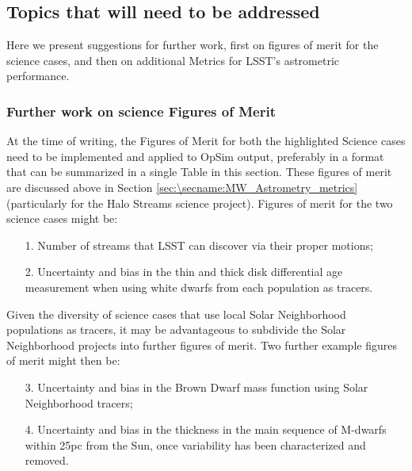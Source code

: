 \subsection{Topics that will need to be addressed}
\label{sec:\secname:MW_Astrometry_furtherwork}

Here we present suggestions for further work, first on figures of
merit for the science cases, and then on additional Metrics for LSST's
astrometric performance.

\subsubsection{Further work on science Figures of Merit}

At the time of writing, the Figures of Merit for both the highlighted
Science cases need to be implemented and applied to OpSim output,
preferably in a format that can be summarized in a single Table in
this section. These figures of merit are discussed above in Section
\ref{sec:\secname:MW_Astrometry_metrics} (particularly for the Halo
Streams science project). Figures of merit for the two science cases
might be:
\begin{itemize}
  \item[1.] Number of streams that LSST can discover via their proper motions;
\item[2.] Uncertainty and bias in the thin and thick disk differential age measurement when using white dwarfs from each population as tracers.
\end{itemize}

Given the diversity of science cases that use local Solar Neighborhood
populations as tracers, it may be advantageous to subdivide the Solar
Neighborhood projects into further figures of merit. Two further example
figures of merit might then be:
\begin{itemize}
  \item[3.] Uncertainty and bias in the Brown Dwarf mass function using Solar Neighborhood tracers;
   \item[4.] Uncertainty and bias in the thickness in the main sequence of M-dwarfs within 25pc from the Sun, once variability has been characterized and removed.
\end{itemize}


